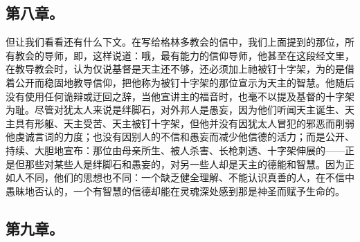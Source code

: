 \subsection{第八章。}

\par

但让我们看看还有什么下文。在写给格林多教会的信中，我们上面提到的那位，所有教会的导师，即，这样说道：哦，最有能力的信仰导师，他甚至在这段经文里，在教导教会时，认为仅说基督是天主还不够，还必须加上祂被钉十字架，为的是借着公开而稳固地教导信仰，把他称为被钉十字架的那位宣示为天主的智慧。他随后没有使用任何诡辩或迂回之辞，当他宣讲主的福音时，也毫不以提及基督的十字架为耻。尽管对犹太人来说是绊脚石，对外邦人是愚妄，因为他们听闻天主诞生、天主具有形躯、天主受苦、天主被钉十字架，但他并没有因犹太人冒犯的邪恶而削弱他虔诚言词的力度；也没有因别人的不信和愚妄而减少他信德的活力；而是公开、持续、大胆地宣布：那位由母亲所生、被人杀害、长枪刺透、十字架伸展的——正是但那些对某些人是绊脚石和愚妄的，对另一些人却是天主的德能和智慧。因为正如人不同，他们的思想也不同：一个缺乏健全理解、不能认识真善的人，在不信中愚昧地否认的，一个有智慧的信德却能在灵魂深处感到那是神圣而赋予生命的。\par


\subsection{第九章。}

\par

